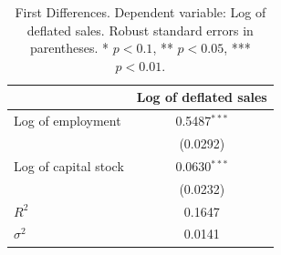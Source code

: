 \begin{table}[!htbp]
\centering
\begin{tabular}{lc}
\toprule
 & Log of deflated sales \\
\midrule
Log of employment & 0.5487$^{***}$ \\
 & (0.0292) \\
\addlinespace
Log of capital stock & 0.0630$^{***}$ \\
 & (0.0232) \\
\midrule
$R^2$ & 0.1647 \\
$\sigma^2$ & 0.0141 \\
\bottomrule
\end{tabular}
\caption{First Differences. Dependent variable: Log of deflated sales. Robust standard errors in parentheses. * $p<0.1$, ** $p<0.05$, *** $p<0.01$.}
\label{tab:first_differences}
\end{table}
